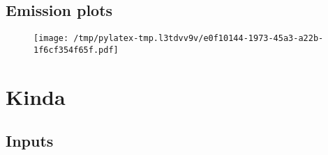 \documentclass{article}%
\begin{document}
\subsection{Emission plots}%
\label{subsec:Emissionplots}%


\begin{figure}[htbp]%
\centering%
\texttt{[image: /tmp/pylatex-tmp.l3tdvv9v/e0f10144-1973-45a3-a22b-1f6cf354f65f.pdf]}%
\end{figure}

%
\section{Kinda}%
\label{sec:Kinda}%
\subsection{Inputs}%
\label{subsec:Inputs}%
\end{document}
